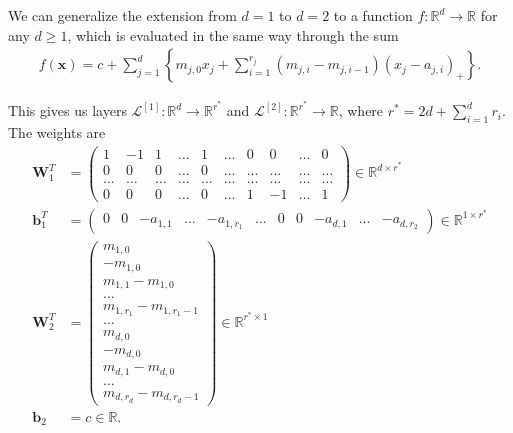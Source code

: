 \documentclass{somasmsc}
\begin{document}
We can generalize the extension from $d=1$ to $d=2$ to a function $f: \mathbb{R}^d \rightarrow \mathbb{R}$ for any $d \geq 1$, which is evaluated in the same way through the sum
\begin{align*}
f\left(\pmb{x}\right) = c + \sum_{j=1}^d \left\{m_{j,0} x_j + \sum_{i=1}^{r_j} \left(m_{j,i} - m_{j,i-1}\right) \left(x_j - a_{j,i}\right)_+\right\}.
\end{align*}

This gives us layers $\mathcal{L}^{\left[1\right]}: \mathbb{R}^d \rightarrow \mathbb{R}^{r^*}$ and $\mathcal{L}^{\left[2\right]}: \mathbb{R}^{r^*} \rightarrow \mathbb{R}$, where $r^* = 2d + \sum_{i=1}^d r_i$. The weights are
\setcounter{MaxMatrixCols}{11}
\begin{align*}
\mathbf{W}_1^T &=
\begin{pmatrix}
    1 & -1 & 1 & \dots & 1 & \dots & 0 & 0 & \dots & 0 \\
    0 & 0 & 0 & \dots & 0 & \dots & \dots & \dots & \dots & \dots \\
    \dots & \dots & \dots & \dots & \dots & \dots & \dots & \dots & \dots & \dots \\
    0 & 0 & 0 & \dots & 0 & \dots & 1 & -1 & \dots & 1
\end{pmatrix} \in \mathbb{R}^{d \times r^*} \\
\pmb{b}_1^T &= 
\begin{pmatrix}
    0 & 0 & -a_{1,1} & \dots & -a_{1,r_1} & \dots & 0 & 0 & -a_{d,1} & \dots & -a_{d,r_2}
\end{pmatrix} \in \mathbb{R}^{1 \times r^*} \\
\mathbf{W}_2^T &=
\begin{pmatrix}
    m_{1,0} \\
    -m_{1,0} \\
    m_{1,1} - m_{1,0} \\
    \dots \\
    m_{1,r_1} - m_{1,r_1 - 1} \\
    \dots \\
    m_{d,0} \\
    -m_{d,0}\\
    m_{d,1} - m_{d,0} \\
    \dots \\
    m_{d,r_d} - m_{d,r_d - 1}
\end{pmatrix} \in \mathbb{R}^{r^* \times 1} \\
\pmb{b}_2 &= c \in \mathbb{R}.
\end{align*}
\end{document}
